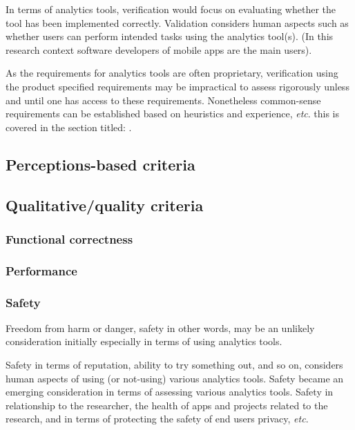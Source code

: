 In terms of analytics tools, verification would focus on evaluating whether the tool has been implemented correctly. Validation considers human aspects such as whether users can perform intended tasks using the analytics tool(s). (In this research context software developers of mobile apps are the main users).

As the requirements for analytics tools are often proprietary, verification using the product specified requirements may be impractical to assess rigorously unless and until one has access to these requirements. Nonetheless common-sense requirements can be established based on heuristics and experience, \emph{etc}. this is covered in the section titled: \href{rubric-for-evaluating-analytics-tools}{}.

\subsection{Perceptions-based criteria}

\subsection{Qualitative/quality criteria}

\subsubsection{Functional correctness}

\subsubsection{Performance}

\subsubsection{Safety}
Freedom from harm or danger, safety in other words, may be an unlikely consideration initially especially in terms of using analytics tools. 

Safety in terms of reputation, ability to try something out, and so on, considers human aspects of using (or not-using) various analytics tools. Safety became an emerging consideration in terms of assessing various analytics tools. Safety in relationship to the researcher, the health of apps and projects related to the research, and in terms of protecting the safety of end users privacy, \emph{etc}.

